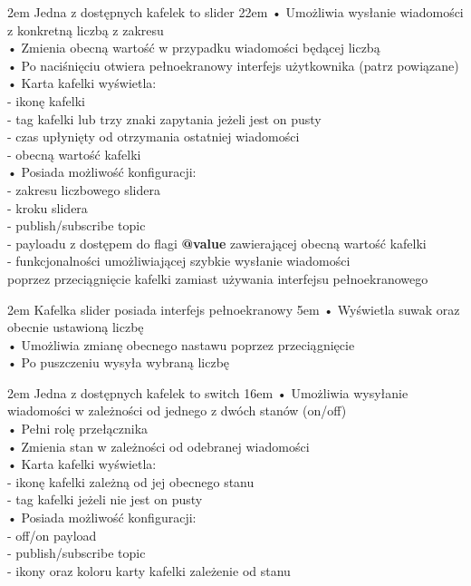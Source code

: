 {2em}{
    Jedna z dostępnych kafelek to slider
}
{22em}{
    • Umożliwia wysłanie wiadomości z konkretną liczbą z zakresu\\
    • Zmienia obecną wartość w przypadku wiadomości będącej liczbą\\
    • Po naciśnięciu otwiera pełnoekranowy interfejs użytkownika (patrz powiązane)\\

    • Karta kafelki wyświetla:\\
    - ikonę kafelki\\
    - tag kafelki lub trzy znaki zapytania jeżeli jest on pusty\\
    - czas upłynięty od otrzymania ostatniej wiadomości\\
    - obecną wartość kafelki\\

    • Posiada możliwość konfiguracji:\\
    - zakresu liczbowego slidera\\
    - kroku slidera\\
    - publish/subscribe topic\\
    - payloadu z dostępem do flagi \textbf{@value} zawierającej obecną wartość kafelki\\
    - funkcjonalności umożliwiającej szybkie wysłanie wiadomości\\
    \hspace*{0.5em} poprzez przeciągnięcie kafelki zamiast używania interfejsu pełnoekranowego
}

{2em}{
    Kafelka slider posiada interfejs pełnoekranowy}
{5em}{
    • Wyświetla suwak oraz obecnie ustawioną liczbę\\
    • Umożliwia zmianę obecnego nastawu poprzez przeciągnięcie\\
    • Po puszczeniu wysyła wybraną liczbę
}

{2em}{
    Jedna z dostępnych kafelek to switch
}
{16em}{
    • Umożliwia wysyłanie wiadomości w zależności od jednego z dwóch stanów (on/off)\\
    • Pełni rolę przełącznika\\
    • Zmienia stan w zależności od odebranej wiadomości\\

    • Karta kafelki wyświetla:\\
    - ikonę kafelki zależną od jej obecnego stanu\\
    - tag kafelki jeżeli nie jest on pusty\\

    • Posiada możliwość konfiguracji:\\
    - off/on payload\\
    - publish/subscribe topic\\
    - ikony oraz koloru karty kafelki zależenie od stanu
}

